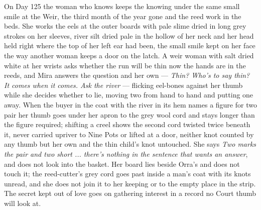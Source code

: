 \documentclass{design/chronicle}
\begin{document}
{On Day 125 the woman who knows keeps the knowing under the same small smile at the Weir, the third month of the year gone and the reed work in the beds. She works the eels at the outer boards with pale slime dried in long grey strokes on her sleeves, river silt dried pale in the hollow of her neck and her head held right where the top of her left ear had been, the small smile kept on her face the way another woman keeps a door on the latch. A weir woman with salt dried white at her wrists asks whether the run will be thin now the hands are in the reeds, and Mira answers the question and her own — \emph{Thin? Who’s to say thin? It comes when it comes. Ask the river} — flicking eel-bones against her thumb while she decides whether to lie, moving two from hand to hand and putting one away. When the buyer in the coat with the river in its hem names a figure for two pair her thumb goes under her apron to the grey wool cord and stays longer than the figure required; shifting a creel shows the second cord twisted twice beneath it, never carried upriver to Nine Pots or lifted at a door, neither knot counted by any thumb but her own and the thin child’s knot untouched. She says \emph{Two marks the pair and two short ... there’s nothing in the sentence that wants an answer}, and does not look into the basket. Her board lies beside Orra’s and does not touch it; the reed-cutter’s grey cord goes past inside a man’s coat with its knots unread, and she does not join it to her keeping or to the empty place in the strip. The secret kept out of love goes on gathering interest in a record no Court thumb will look at.

}
\end{document}
